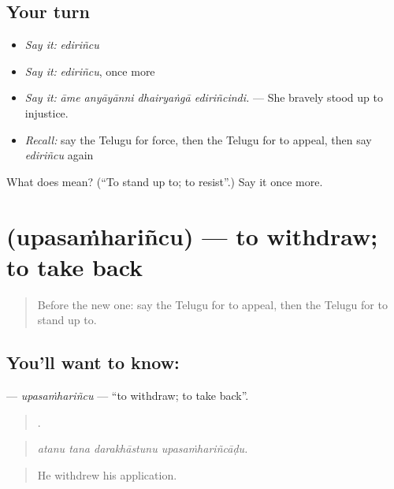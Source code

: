 \subsection*{Your turn}
\begin{itemize}
\raggedright
  \item \emph{Say it:} \emph{ediriñcu}
  \item \emph{Say it:} \emph{ediriñcu}, once more
  \item \emph{Say it:} \emph{āme anyāyānni dhairyaṅgā ediriñcindi.} — She bravely stood up to injustice.
  \item \emph{Recall:} say the Telugu for force, then the Telugu for to appeal, then say \emph{ediriñcu} again
\end{itemize}

\begin{tcolorbox}[breakable,colback=teal!4,colframe=teal!35!black,title={Before you move on}]
What does  mean? (\textquotedblleft{}To stand up to; to resist\textquotedblright{}.) Say it once more.
\end{tcolorbox}
\section[\texorpdfstring{\te{ఉపసంహరించు} (upasaṁhariñcu)}{ఉపసంహరించు (upasaṁhariñcu)}]{ (upasaṁhariñcu) — to withdraw; to take back}

\label{lesson:TE-C424-upasamharincu}



\begin{quote}
Before the new one: say the Telugu for to appeal, then the Telugu for to stand up to.
\end{quote}

\subsection*{You'll want to know: }
\textbf{} — \emph{upasaṁhariñcu} — \textquotedblleft{}to withdraw; to take back\textquotedblright{}.

\begin{quote}
   .
\end{quote}

\begin{quote}
\emph{atanu tana darakhāstunu upasaṁhariñcāḍu.}
\end{quote}

\begin{quote}
He withdrew his application.
\end{quote}

